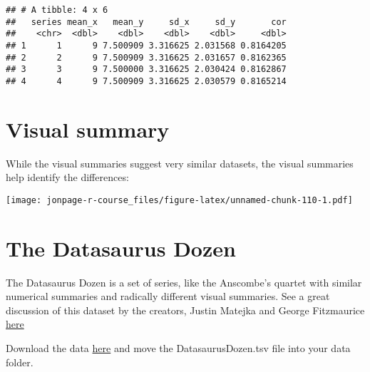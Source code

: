 \documentclass[]{book}
\newenvironment{Shaded}{\begin{snugshade}}{\end{snugshade}}
\newcommand{\KeywordTok}[1]{\textcolor[rgb]{0.13,0.29,0.53}{\textbf{{#1}}}}
\newcommand{\StringTok}[1]{\textcolor[rgb]{0.31,0.60,0.02}{{#1}}}
\newcommand{\NormalTok}[1]{{#1}}
\theoremstyle{definition}
\theoremstyle{definition}
\theoremstyle{remark}
\begin{document}
\begin{verbatim}
## # A tibble: 4 x 6
##   series mean_x   mean_y     sd_x     sd_y       cor
##    <chr>  <dbl>    <dbl>    <dbl>    <dbl>     <dbl>
## 1      1      9 7.500909 3.316625 2.031568 0.8164205
## 2      2      9 7.500909 3.316625 2.031657 0.8162365
## 3      3      9 7.500000 3.316625 2.030424 0.8162867
## 4      4      9 7.500909 3.316625 2.030579 0.8165214
\end{verbatim}

\section*{Visual summary}\label{visual-summary}

While the visual summaries suggest very similar datasets, the visual
summaries help identify the differences:

\begin{Shaded}
\end{Shaded}

\texttt{[image: jonpage-r-course\_files/figure-latex/unnamed-chunk-110-1.pdf]}

\section*{The Datasaurus Dozen}\label{the-datasaurus-dozen}

The Datasaurus Dozen is a set of series, like the Anscombe's quartet
with similar numerical summaries and radically different visual
summaries. See a great discussion of this dataset by the creators,
Justin Matejka and George Fitzmaurice
\href{https://www.autodeskresearch.com/publications/samestats}{here}

Download the data
\href{https://www.autodeskresearch.com/sites/default/files/The\%20Datasaurus\%20Dozen.zip}{here}
and move the DatasaurusDozen.tsv file into your data folder.
\end{document}

